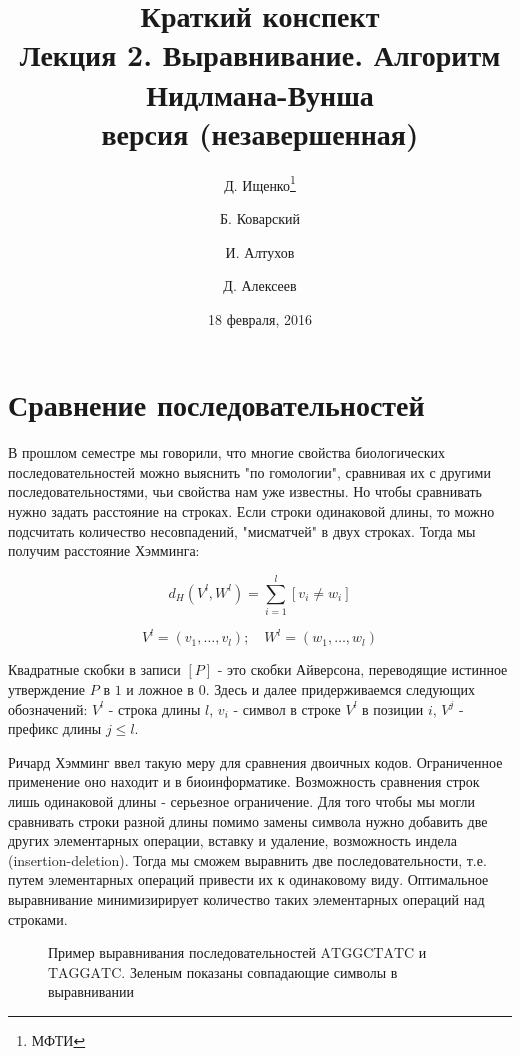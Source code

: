 \documentclass[letterpaper, 11pt]{article}
\title{\large{Краткий конспект}\\
\LARGE{Лекция 2. Выравнивание. Алгоритм Нидлмана-Вунша}\\
\normalsize версия \versionnumber (\textcolor{NavyBlue}{незавершенная})}
\date{18 февраля, 2016}
\author{Д. Ищенко\thanks{МФТИ} \and Б. Коварский\footnotemark[1]
\and И. Алтухов\footnotemark[1] \and Д. Алексеев\footnotemark[1]}
\begin{document}
\maketitle
\thispagestyle{empty}
\clearpage

\section{Сравнение последовательностей}

В прошлом семестре мы говорили, что многие свойства биологических последовательностей можно выяснить "по гомологии", сравнивая их с другими последовательностями, чьи свойства нам уже известны. Но чтобы сравнивать нужно задать расстояние на строках. Если строки одинаковой длины, то можно подсчитать количество несовпадений, "мисматчей" в двух строках. Тогда мы получим расстояние Хэмминга:

$$d_H(V^l, W^l)=\sum_{i=1}^l[v_i\ne w_i]$$

$$V^l=(v_1,\ldots,v_l);\quad W^l=(w_1,\ldots,w_l)$$

Квадратные скобки в записи $[P]$ - это скобки Айверсона, переводящие истинное утверждение $P$ в $1$ и ложное в $0$. Здесь и далее придерживаемся следующих обозначений: $V^l$ - строка длины $l$, $v_i$ - символ в строке $V^l$ в позиции $i$, $V^j$ - префикс длины $j\le l$.

Ричард Хэмминг ввел такую меру для сравнения двоичных кодов. Ограниченное применение оно находит и в биоинформатике. Возможность сравнения строк лишь одинаковой длины - серьезное ограничение. Для того чтобы мы могли сравнивать строки разной длины помимо замены символа нужно добавить две других элементарных операции, вставку и удаление, возможность индела (insertion-deletion). Тогда мы сможем выравнить две последовательности, т.е. путем элементарных операций привести их к одинаковому виду. Оптимальное выравнивание минимизирирует количество таких элементарных операций над строками.

\begin{figure}[H]
  \caption{Пример выравнивания последовательностей $\mathrm{ATGGCTATC}$ и $\mathrm{TAGGATC}$. Зеленым показаны совпадающие символы в выравнивании}
\end{figure}
\end{document}
